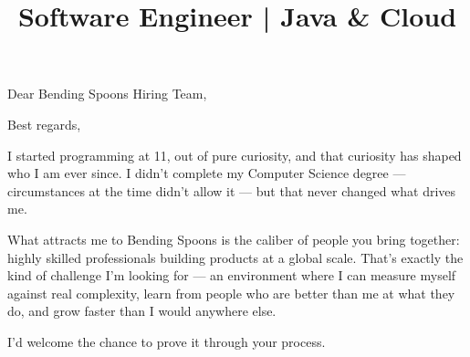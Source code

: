 \documentclass[11pt,a4paper]{moderncv}
\title{Software Engineer | Java \& Cloud}
\begin{document}
\date{}
\opening{Dear Bending Spoons Hiring Team,}
\closing{Best regards,}
\makeatletter
\renewcommand*{\makeletterclosing}{\@closing\\[1.2em]{\bfseries\@firstname~\@lastname}}
\makeatother
\makelettertitle

I started programming at 11, out of pure curiosity, and that curiosity has shaped who I am ever since. I didn't complete my Computer Science degree — circumstances at the time didn't allow it — but that never changed what drives me.

What attracts me to Bending Spoons is the caliber of people you bring together: highly skilled professionals building products at a global scale. That's exactly the kind of challenge I'm looking for — an environment where I can measure myself against real complexity, learn from people who are better than me at what they do, and grow faster than I would anywhere else.

I'd welcome the chance to prove it through your process.

\makeletterclosing
\end{document}
